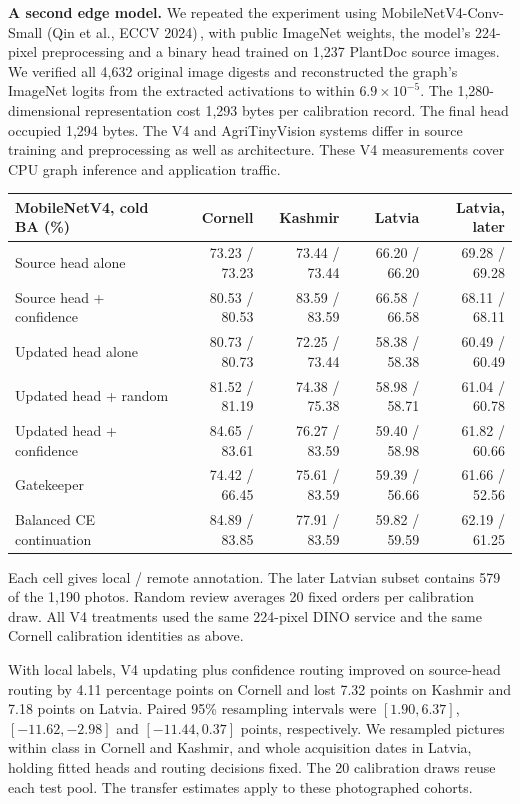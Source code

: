 \begin{samepage}\medskip\noindent\textbf{A second edge model.}
We repeated the experiment using MobileNetV4-Conv-Small (Qin et al., ECCV 2024)\,\cite{vfour}, with public ImageNet weights, the model's 224-pixel preprocessing and a binary head trained on 1,237 PlantDoc source images. We verified all 4,632 original image digests and reconstructed the graph's ImageNet logits from the extracted activations to within $6.9\times10^{-5}$. The 1,280-dimensional representation cost 1,293 bytes per calibration record. The final head occupied 1,294 bytes. The V4 and AgriTinyVision systems differ in source training and preprocessing as well as architecture. These V4 measurements cover CPU graph inference and application traffic.\par\end{samepage}

\begin{center}\begingroup\small\setlength{\tabcolsep}{4pt}
\begin{tabular}{@{}lrrrr@{}}\toprule
MobileNetV4, cold BA (\%) & Cornell & Kashmir & Latvia & Latvia, later\\
\midrule
Source head alone&73.23 / 73.23&73.44 / 73.44&66.20 / 66.20&69.28 / 69.28\\
Source head + confidence&80.53 / 80.53&83.59 / 83.59&66.58 / 66.58&68.11 / 68.11\\
Updated head alone&80.73 / 80.73&72.25 / 73.44&58.38 / 58.38&60.49 / 60.49\\
Updated head + random&81.52 / 81.19&74.38 / 75.38&58.98 / 58.71&61.04 / 60.78\\
Updated head + confidence&84.65 / 83.61&76.27 / 83.59&59.40 / 58.98&61.82 / 60.66\\
Gatekeeper&74.42 / 66.45&75.61 / 83.59&59.39 / 56.66&61.66 / 52.56\\
Balanced CE continuation&84.89 / 83.85&77.91 / 83.59&59.82 / 59.59&62.19 / 61.25\\
\bottomrule\end{tabular}\endgroup\end{center}
{\footnotesize Each cell gives local / remote annotation. The later Latvian subset contains 579 of the 1,190 photos. Random review averages 20 fixed orders per calibration draw. All V4 treatments used the same 224-pixel DINO service and the same Cornell calibration identities as above.\par}

With local labels, V4 updating plus confidence routing improved on source-head routing by 4.11 percentage points on Cornell and lost 7.32 points on Kashmir and 7.18 points on Latvia. Paired 95\% resampling intervals were $[1.90,6.37]$, $[-11.62,-2.98]$ and $[-11.44,0.37]$ points, respectively. We resampled pictures within class in Cornell and Kashmir, and whole acquisition dates in Latvia, holding fitted heads and routing decisions fixed. The 20 calibration draws reuse each test pool. The transfer estimates apply to these photographed cohorts.
